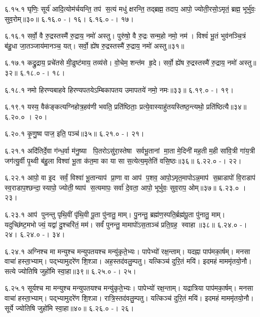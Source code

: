 ६.१५.१
घृणिः॒ सूर्य॑ आदि॒त्योम॑र्चयन्ति॒ तप॑ स॒त्यं मधु॑ क्षरन्ति॒ तद्ब्रह्म॒ तदाप॒ आपो॒ ज्योती॒रसो॒ऽमृतं॒ ब्रह्म॒ भूर्भु॑वः॒ सुव॒रोम्॥३०॥
६.१६.०
-। १६।
६.१६.०
-। १७।
\anuvakamend

६.१६.१
सर्वो॒ वै रु॒द्रस्तस्मै॑ रु॒द्राय॒ नमो॑ अस्तु। पुरु॑षो॒ वै रु॒द्रः सन्म॒हो नमो॒ नम॑। विश्वं॑ भू॒तं भुव॑नञ्चि॒त्रं ब॑हु॒धा जा॒तञ्जाय॑मानञ्च॒ यत्। सर्वो॒ ह्ये॑ष रु॒द्रस्तस्मै॑ रु॒द्राय॒ नमो॑ अस्तु॥३१॥
\anuvakamend

६.१७.१
कद्रु॒द्राय॒ प्रचे॑तसे मी॒ढुष्ट॑माय॒ तव्य॑से। वो॒चेम॒ शन्त॑म हृ॒दे। सर्वो॒ ह्ये॑ष रु॒द्रस्तस्मै॑ रु॒द्राय॒ नमो॑ अस्तु॥३२॥
६.१८.०
-। १८।
\anuvakamend

६.१८.१
नमो हिरण्यबाहवे हिरण्यपतयेऽम्बिकापतय उमापतये॑ नमो॒ नमः॥३३॥
६.१९.०
-। १९।
\anuvakamend

६.१९.१
यस्य॒ वैक॑ङ्कत्यग्निहोत्र॒हव॑णी भवति॒ प्रति॑ष्ठिताः॒ प्रत्ये॒वास्याहु॑तयस्तिष्ठ॒न्त्यथो॒ प्रति॑ष्ठित्यै॥३४॥
६.२०.०
। २०।
\anuvakamend

६.२०.१
कृ॒णु॒ष्व पाज॒ इति॒ पञ्च॑॥३५॥
६.२१.०
-। २१।
\anuvakamend

६.२१.१
अदि॑तिर्दे॒वा ग॑न्ध॒र्वा म॑नु॒ष्या पि॒तरोऽसु॑रा॒स्तेषा सर्वभू॒तानां मा॒ता मे॒दिनी॑ मह॒ती म॒ही सा॑वि॒त्री गा॑य॒त्री जग॑त्यु॒र्वी पृ॒थ्वी ब॑हु॒ला विश्वा॑ भू॒ता क॑त॒मा का या सा स॒त्येत्य॒मृतेति॑ वसि॒ष्ठः॥३६॥
६.२२.०
-। २२।
\anuvakamend

६.२२.१
आपो॒ वा इ॒द सर्वं॒  विश्वा॑ भू॒तान्याप॑ प्रा॒णा वा आप॑ प॒शव॒ आपो॒ऽमृत॒मापोऽन्न॒माप॑ स॒म्राडापो॑ वि॒राडाप॑ स्व॒राडाप॒श्छन्दा॒स्यापो॒ ज्योती॒ष्याप॑ स॒त्यमापः॒ सर्वा॑ दे॒वता॒ आपो॒ भूर्भुवः॒ सुव॒राप॒ ओम्॥३७॥
६.२३.०
। २३।
\anuvakamend

६.२३.१
आप॑ पुनन्तु पृथि॒वीं पृ॑थि॒वी पू॒ता पु॑नातु॒ माम्। पु॒नन्तु॒ ब्रह्म॑ण॒स्पति॒र्ब्रह्म॑पू॒ता पु॑नातु॒ माम्। यदुच्छि॑ष्ट॒मभोज्यं॒ यद्वा॑ दु॒श्चरि॑तं॒ मम॑। सर्वं॑ पुनन्तु॒ मामापो॑ऽस॒ताञ्च॑ प्रति॒ग्रह॒ स्वाहा॥३८॥
६.२४.०
-। २४।
६.२४.०
-। ३४।
\anuvakamend

६.२४.१
अग्निश्च मा मन्युश्च मन्युपतयश्च मन्यु॑कृते॒भ्यः। पापेभ्यो॑ रक्ष॒न्ताम्। यदह्ना पाप॑मका॒र्\mbox{}षम्। मनसा वाचा॑ हस्ता॒भ्याम्। पद्भ्यामुदरे॑ण शि॒श्ञा। अह॒स्तद॑वलु॒म्पतु। यत्किञ्च॑ दुरि॒तं मयि॑। इदमहं माममृ॑तयो॒नौ। सत्ये ज्योतिषि जुहो॑मि स्वा॒हा॥३९॥
६.२५.०
-। २५।
\anuvakamend

६.२५.१
सूर्यश्च मा मन्युश्च मन्युपतयश्च मन्यु॑कृते॒भ्यः। पापेभ्यो॑ रक्ष॒न्ताम्। यद्रात्रिया पाप॑मका॒र्\mbox{}षम्। मनसा वाचा॑ हस्ता॒भ्याम्। पद्भ्यामुदरे॑ण शि॒श्ञा। रात्रि॒स्तद॑वलु॒म्पतु। यत्किञ्च॑ दुरि॒तं मयि॑। इदमहं माममृ॑तयो॒नौ। सूर्ये ज्योतिषि जुहो॑मि स्वा॒हा॥४०॥
६.२६.०
-। २६।
\anuvakamend

